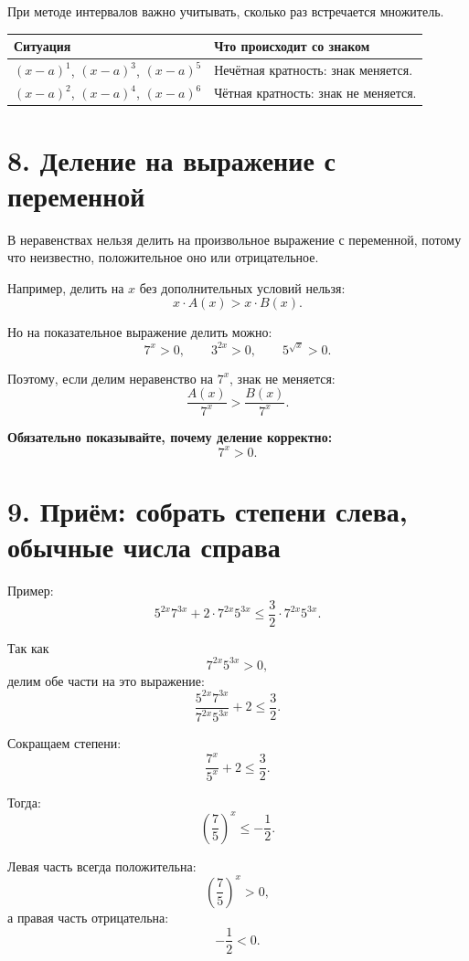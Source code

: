 \documentclass[a4paper,12pt]{article}
\newcommand{\sectionline}{\vspace{2mm}{\color{linegray}\hrule height 0.5pt}\vspace{2mm}}
\newcommand{\important}[1]{\textcolor{darkaccent}{\textbf{#1}}}
\begin{document}
При методе интервалов важно учитывать, сколько раз встречается множитель.

\begin{center}
\renewcommand{\arraystretch}{1.45}
\begin{tabularx}{\linewidth}{@{}lX@{}}
\toprule
Ситуация & Что происходит со знаком \\
\midrule
$(x-a)^1$, $(x-a)^3$, $(x-a)^5$ & Нечётная кратность: знак меняется. \\
$(x-a)^2$, $(x-a)^4$, $(x-a)^6$ & Чётная кратность: знак не меняется. \\
\bottomrule
\end{tabularx}
\end{center}

\sectionline

\section*{\textcolor{darkaccent}{8. Деление на выражение с переменной}}

В неравенствах нельзя делить на произвольное выражение с переменной, потому что неизвестно, положительное оно или отрицательное.

Например, делить на $x$ без дополнительных условий нельзя:
\[
x\cdot A(x)>x\cdot B(x).
\]

Но на показательное выражение делить можно:
\[
7^x>0,\qquad 3^{2x}>0,\qquad 5^{\sqrt{x}}>0.
\]

Поэтому, если делим неравенство на $7^x$, знак не меняется:
\[
\frac{A(x)}{7^x}>\frac{B(x)}{7^x}.
\]

\important{Обязательно показывайте, почему деление корректно:}
\[
7^x>0.
\]

\sectionline

\section*{\textcolor{darkaccent}{9. Приём: собрать степени слева, обычные числа справа}}

Пример:
\[
5^{2x}7^{3x}+2\cdot7^{2x}5^{3x}\le\frac32\cdot7^{2x}5^{3x}.
\]

Так как
\[
7^{2x}5^{3x}>0,
\]
делим обе части на это выражение:
\[
\frac{5^{2x}7^{3x}}{7^{2x}5^{3x}}+2\le\frac32.
\]

Сокращаем степени:
\[
\frac{7^x}{5^x}+2\le\frac32.
\]

Тогда:
\[
\left(\frac75\right)^x\le -\frac12.
\]

Левая часть всегда положительна:
\[
\left(\frac75\right)^x>0,
\]
а правая часть отрицательна:
\[
-\frac12<0.
\]
\end{document}
